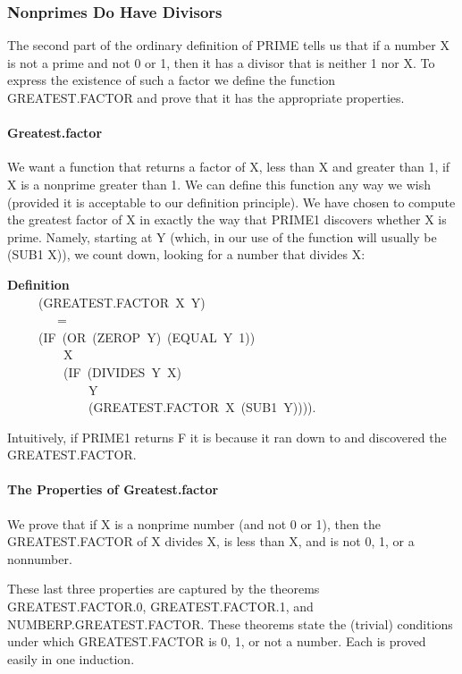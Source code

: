 \documentclass[10pt]{book}
\newenvironment{pubasis}{\begin{flushleft}}{\end{flushleft}}
\newcommand{\axiomordefinition}[1]{\vspace{6pt}\Large\textsf{\textbf{#1}}\normalsize}
\begin{document}
\subsubsection{Nonprimes Do Have Divisors}
The second part of the ordinary definition of
PRIME tells us that if a number X is not a prime
and not 0 or 1, then it has a divisor that is
neither 1 nor X.  To  express the existence of
such a factor we define     the function	
GREATEST.FACTOR and prove that it has the appropriate properties.
\paragraph{Greatest.factor}
We want a function that returns a factor of X, less than X and
greater than 1,   if X is a nonprime
greater than 1.  We can define this function any way we wish
(provided it is acceptable to our definition principle).
We have chosen to compute the greatest factor of X in exactly
the way that PRIME1 discovers whether X is prime.  Namely, starting
at Y (which, in our use of the function will usually
be (SUB1 X)), we  count down, looking for a number that divides X:

\begin{pubasis}
\axiomordefinition{Definition}\\
~~~~~(GREATEST.FACTOR~X~Y)\\
~~~~~~~~=\\
~~~~~(IF~(OR~(ZEROP~Y)~(EQUAL~Y~1))\\
~~~~~~~~~X\\
~~~~~~~~~(IF~(DIVIDES~Y~X)\\
~~~~~~~~~~~~~Y\\
~~~~~~~~~~~~~(GREATEST.FACTOR~X~(SUB1~Y)))).\\
\end{pubasis}
Intuitively, if PRIME1 returns F it
is because it ran down to and discovered
the GREATEST.FACTOR.  

\paragraph{The Properties of Greatest.factor}
We prove that if X is a nonprime number (and not 0 or 1), then the GREATEST.FACTOR of X divides X, is less than X,
and is not 0, 1, or a nonnumber.

These last three properties are captured by
the theorems GREATEST.FACTOR.0, GREATEST.FACTOR.1, and NUMBERP.GREATEST.FACTOR.
These theorems state the (trivial) conditions under which GREATEST.FACTOR
is 0, 1, or not a number.  Each is proved easily in one induction.
\end{document}
